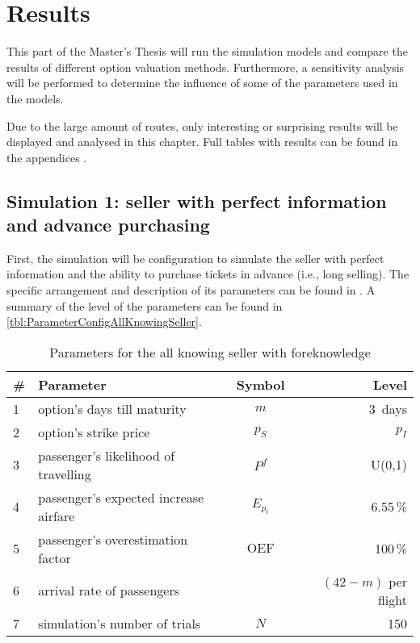 \chapter{Results}
This part of the Master's Thesis will run the simulation models and compare the results of different option valuation methods. Furthermore, a sensitivity analysis will be performed to determine the influence of some of the parameters used in the models.

Due to the large amount of routes, only interesting or surprising results will be displayed and analysed in this chapter. Full tables with results can be found in the appendices .


\section{Simulation 1: seller with perfect information and advance purchasing}
First, the simulation will be configuration to simulate the  seller with perfect information and the ability to purchase tickets in advance (i.e., long selling). The specific arrangement and description of its parameters can be found in . A summary of the level of the parameters can be found in \autoref{tbl:ParameterConfigAllKnowingSeller}.


\begin{table}
\begin{center}
\begin{tabular}{l l c r}
    \toprule
    \#  & Parameter  &  Symbol  &  Level \\
    \midrule
    1  &  option's days till maturity  &  $m$  & 3~days \\
    2  &  option's strike price  &  $p_S$  &  $p_I$  \\
    3  &  passenger's likelihood of travelling  &  $P^f$  &  U(0,1) \\
    4  &  passenger's expected increase airfare  &  $E_{p_t}$  &  6.55\,\% \\
    5  &  passenger's overestimation factor &  $\mbox{OEF}$  &  100\,\% \\
    6  &  arrival rate of passengers  &  ~  &  $(42 - m)$ per flight \\
    7  &  simulation's number of trials  &  $N$  &  150 \\
    \bottomrule
\end{tabular}
\caption{Parameters for the all knowing seller with foreknowledge}
\label{tbl:ParameterConfigAllKnowingSeller}
\end{center}
\end{table}


